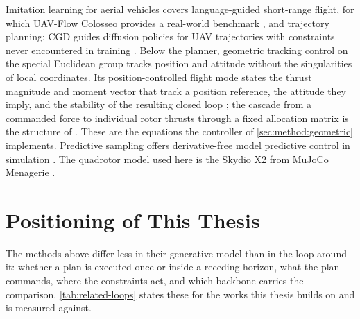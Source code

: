 Imitation learning for aerial vehicles covers language-guided short-range flight, for which UAV-Flow
Colosseo provides a real-world benchmark \parencite{wang2025uavflow}, and trajectory planning: CGD
guides diffusion policies for \ac{UAV} trajectories with constraints never encountered in training
\parencite{kondo2024cgd}. Below the planner, geometric tracking control on the special Euclidean group
tracks position and attitude without the singularities of local coordinates. Its
position-controlled flight mode states the thrust magnitude and moment vector that track a position
reference, the attitude they imply, and the stability of the resulting closed loop
\parencite[Eqs.~(19)--(23), Prop.~3]{lee2010geometric}; the cascade from a commanded force to
individual rotor thrusts through a fixed allocation matrix is the structure of
\parencite{mellinger2011minimum}. These are the equations the controller of
\autoref{sec:method:geometric} implements. Predictive sampling offers derivative-free model
predictive control in simulation \parencite{howell2022predictive}. The quadrotor model used here is the Skydio X2 from MuJoCo
Menagerie \parencite{zakka2022menagerie}.

\section{Positioning of This Thesis}\label{sec:rel:positioning}

The methods above differ less in their generative model than in the loop around it: whether a plan is
executed once or inside a receding horizon, what the plan commands, where the constraints act, and
which backbone carries the comparison. \autoref{tab:related-loops} states these for the works this
thesis builds on and is measured against.

